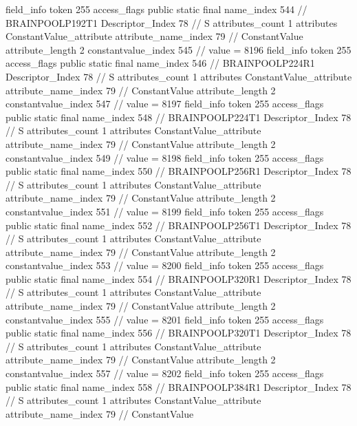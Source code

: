 {{{{			field_info {
				token	255
				access_flags	public static final
				name_index	544		// BRAINPOOLP192T1
				Descriptor_Index	78		// S
				attributes_count	1
				attributes {
				ConstantValue_attribute {
					attribute_name_index	79		// ConstantValue
					attribute_length	2
					constantvalue_index	545		// value = 8196
				}
				}
			}
			field_info {
				token	255
				access_flags	public static final
				name_index	546		// BRAINPOOLP224R1
				Descriptor_Index	78		// S
				attributes_count	1
				attributes {
				ConstantValue_attribute {
					attribute_name_index	79		// ConstantValue
					attribute_length	2
					constantvalue_index	547		// value = 8197
				}
				}
			}
			field_info {
				token	255
				access_flags	public static final
				name_index	548		// BRAINPOOLP224T1
				Descriptor_Index	78		// S
				attributes_count	1
				attributes {
				ConstantValue_attribute {
					attribute_name_index	79		// ConstantValue
					attribute_length	2
					constantvalue_index	549		// value = 8198
				}
				}
			}
			field_info {
				token	255
				access_flags	public static final
				name_index	550		// BRAINPOOLP256R1
				Descriptor_Index	78		// S
				attributes_count	1
				attributes {
				ConstantValue_attribute {
					attribute_name_index	79		// ConstantValue
					attribute_length	2
					constantvalue_index	551		// value = 8199
				}
				}
			}
			field_info {
				token	255
				access_flags	public static final
				name_index	552		// BRAINPOOLP256T1
				Descriptor_Index	78		// S
				attributes_count	1
				attributes {
				ConstantValue_attribute {
					attribute_name_index	79		// ConstantValue
					attribute_length	2
					constantvalue_index	553		// value = 8200
				}
				}
			}
			field_info {
				token	255
				access_flags	public static final
				name_index	554		// BRAINPOOLP320R1
				Descriptor_Index	78		// S
				attributes_count	1
				attributes {
				ConstantValue_attribute {
					attribute_name_index	79		// ConstantValue
					attribute_length	2
					constantvalue_index	555		// value = 8201
				}
				}
			}
			field_info {
				token	255
				access_flags	public static final
				name_index	556		// BRAINPOOLP320T1
				Descriptor_Index	78		// S
				attributes_count	1
				attributes {
				ConstantValue_attribute {
					attribute_name_index	79		// ConstantValue
					attribute_length	2
					constantvalue_index	557		// value = 8202
				}
				}
			}
			field_info {
				token	255
				access_flags	public static final
				name_index	558		// BRAINPOOLP384R1
				Descriptor_Index	78		// S
				attributes_count	1
				attributes {
				ConstantValue_attribute {
					attribute_name_index	79		// ConstantValue
}}}}}}}
